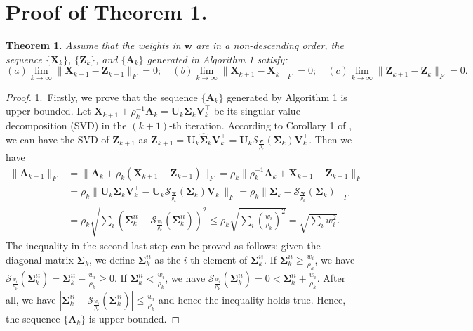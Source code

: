 \documentclass[10pt,onecolumn,letterpaper]{article}
\newtheorem{theorem}{Theorem}
\begin{document}
\section{Proof of Theorem 1.}
\begin{theorem}
Assume that the weights in $\bm{w}$ are in a non-descending order, the sequence $\{\mathbf{X}_{k}\}$, $\{\mathbf{Z}_{k}\}$, and $\{\mathbf{A}_{k}\}$ generated in Algorithm 1 satisfy:
\begin{equation}
(a) \lim_{k \to \infty} \|\mathbf{X}_{k+1}-\mathbf{Z}_{k+1}\|_{F}=0;
\quad
(b) \lim_{k \to \infty} \|\mathbf{X}_{k+1}-\mathbf{X}_{k}\|_{F}=0;
\quad
(c) \lim_{k \to \infty} \|\mathbf{Z}_{k+1}-\mathbf{Z}_{k}\|_{F}=0.
\end{equation}
\end{theorem}
\begin{proof}
1.\ Firstly, we prove that the sequence $\{\mathbf{A}_{k}\}$ generated by Algorithm 1 is upper bounded.
Let $\mathbf{X}_{k+1}+\rho_{k}^{-1}\mathbf{A}_{k}
=
\mathbf{U}_{k}\mathbf{\Sigma}_{k}\mathbf{V}_{k}^{\top}$
be its singular value decomposition (SVD) \cite{eckart1936approximation} in the $(k+1)$-th iteration. According to Corollary 1 of \cite{wnnmijcv}, we can have the SVD of $\mathbf{Z}_{k+1}$ as $\mathbf{Z}_{k+1}=\mathbf{U}_{k}\hat{\mathbf{\Sigma}}_{k}\mathbf{V}_{k}^{\top}=\mathbf{U}_{k}\mathcal{S}_{\frac{\bm{w}}{\rho_{k}}}(\mathbf{\Sigma}_{k})\mathbf{V}_{k}^{\top}$. 
Then we have 
\begin{align}
\|
\mathbf{A}_{k+1}
\|_{F}
&
=
\|
\mathbf{A}_{k}
+
\rho_{k}
(\mathbf{X}_{k+1}-\mathbf{Z}_{k+1})
\|_{F}
=
\rho_{k}\|
\rho_{k}^{-1}
\mathbf{A}_{k}
+
\mathbf{X}_{k+1}
-
\mathbf{Z}_{k+1}
\|_{F}
\\
&
=
\rho_{k}\|
\mathbf{U}_{k}\mathbf{\Sigma}_{k}\mathbf{V}_{k}^{\top}
-
\mathbf{U}_{k}\mathcal{S}_{\frac{\bm{w}}{\rho_{k}}}(\mathbf{\Sigma}_{k})\mathbf{V}_{k}^{\top}
\|_{F}
=
\rho_{k}\|
\mathbf{\Sigma}_{k}
-
\mathcal{S}_{\frac{\bm{w}}{\rho_{k}}}(\mathbf{\Sigma}_{k})
\|_{F}
\\
&
=
\rho_{k}
\sqrt{\sum_{i}(\mathbf{\Sigma}_{k}^{ii}-\mathcal{S}_{\frac{w_{i}}{\rho_{k}}}(\mathbf{\Sigma}_{k}^{ii}))^{2}}
\le
\rho_{k}
\sqrt{\sum_{i}(\frac{w_{i}}{\rho_{k}})^{2}}
=
\sqrt{\sum_{i}w_{i}^{2}}.
\end{align}
The inequality in the second last step can be proved as follows: given the diagonal matrix $\mathbf{\Sigma}_{k}$, we define $\mathbf{\Sigma}_{k}^{ii}$ as the $i$-th element of $\mathbf{\Sigma}_{k}^{ii}$. If $\mathbf{\Sigma}_{k}^{ii}\ge\frac{w_{i}}{\rho_{k}}$, we have $\mathcal{S}_{\frac{w_{i}}{\rho_{k}}}(\mathbf{\Sigma}_{k}^{ii})=\mathbf{\Sigma}_{k}^{ii}-\frac{w_{i}}{\rho_{k}}\ge 0$. If $\mathbf{\Sigma}_{k}^{ii}<\frac{w_{i}}{\rho_{k}}$, we have $\mathcal{S}_{\frac{w_{i}}{\rho_{k}}}(\mathbf{\Sigma}_{k}^{ii})=0<\mathbf{\Sigma}_{k}^{ii}+\frac{w_{i}}{\rho_{k}}$. After all, we have $|\mathbf{\Sigma}_{k}^{ii}-\mathcal{S}_{\frac{w_{i}}{\rho_{k}}}(\mathbf{\Sigma}_{k}^{ii})|\le\frac{w_{i}}{\rho_{k}}$ and hence the inequality holds true. Hence, the sequence $\{\mathbf{A}_{k}\}$ is upper bounded.


\end{proof}
\end{document}

